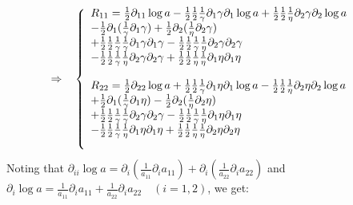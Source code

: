   \begin{align}
 \Rightarrow\quad &\left \{ \begin{array}{l}
 R_{11} =  \frac{1}{2}\partial_{11} \log a - \frac{1}{2} \frac{1}{2}\frac{1}{\gamma}\partial_1 \gamma\partial_1 \log a+ \frac{1}{2} \frac{1}{2}\frac{1}{\eta}\partial_2 \gamma\partial_2 \log a \\
 -\frac{1}{2}\partial_1(\frac{1}{\gamma}\partial_1 \gamma)+\frac{1}{2}\partial_2(\frac{1}{\eta}\partial_2 \gamma)
 \\ + \frac{1}{2}\frac{1}{2}\frac{1}{\gamma}\frac{1}{\gamma}\partial_1 \gamma\partial_1 \gamma- \frac{1}{2}\frac{1}{2}\frac{1}{\gamma}\frac{1}{\eta}\partial_2 \gamma \partial_2 \gamma \\
 - \frac{1}{2}\frac{1}{2}\frac{1}{\gamma}\frac{1}{\eta}\partial_2 \gamma\partial_2 \gamma+ \frac{1}{2}\frac{1}{2}\frac{1}{\eta}\frac{1}{\eta}\partial_1 \eta\partial_1 \eta\\\\
  R_{22} =  \frac{1}{2}\partial_{22} \log a + \frac{1}{2}\frac{1}{2}\frac{1}{\gamma}\partial_1 \eta\partial_1 \log a- \frac{1}{2} \frac{1}{2}\frac{1}{\eta}\partial_2 \eta\partial_2 \log a \\
 +\frac{1}{2}\partial_1(\frac{1}{\gamma}\partial_1 \eta)-\frac{1}{2}\partial_2(\frac{1}{\eta}\partial_2 \eta)  
 \\ + \frac{1}{2}\frac{1}{2}\frac{1}{\gamma}\frac{1}{\gamma}\partial_2 \gamma\partial_2 \gamma- \frac{1}{2}\frac{1}{2}\frac{1}{\gamma}\frac{1}{\eta}\partial_1 \eta\partial_1 \eta \\
 - \frac{1}{2}\frac{1}{2}\frac{1}{\gamma}\frac{1}{\eta}\partial_1 \eta \partial_1 \eta+ \frac{1}{2}\frac{1}{2}\frac{1}{\eta}\frac{1}{\eta}\partial_2 \eta\partial_2 \eta\\\\
 \end {array}\right.
 \end{align}
 Noting that $\partial_{ii}\log a = \partial_{i}\left(\frac{1}{a_{11}}\partial_{i} a_{11}\right) + \partial_{i}\left(\frac{1}{a_{22}}\partial_{i} a_{22}\right)$ and $\partial_{i}\log a = \frac{1}{a_{11}}\partial_{i} a_{11} + \frac{1}{a_{22}}\partial_{i} a_{22}\quad (i=1,2)$, we get:\\
